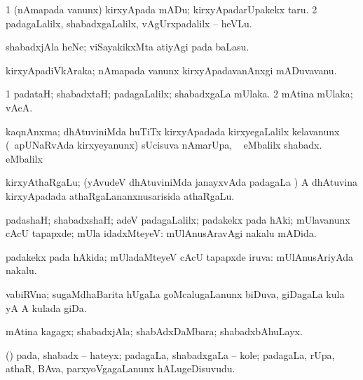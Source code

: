 \bentry
{} 
\gl{\sakirx}
\expl{}
\bmng
\bnum
\num{1} (nAmapada \mo vanunx) kirxyApada mADu; kirxyApadarUpakekx taru. 
\num{2} padagaLalilx, shabadxgaLalilx, vAgUrxpadalilx -- heVLu. 
\enum
\emng

\noindent 
\gl{\akirx}
\expl{}
\bmng
 shabadxjAla heNe; viSayakikxMta atiyAgi pada baLasu. 
\emng
\eentry

\bentry 
{} 
\gl{\nA}
\expl{}
\bmng
 kirxyApadiVkAraka; nAmapada \mo vanunx kirxyApadavanAnxgi mADuvavanu. 
\emng
\eentry

\bentry
{} 
\gl{\kirxvi}
\expl{}
\bmng
\bnum
\num{1} padataH; shabadxtaH; padagaLalilx; shabadxgaLa mUlaka. 
\num{2} mAtina mUlaka; vAcA. 
\enum
\emng
\eentry

\bentry
{} 
\gl{\nA}
\expl{}
\bmng
 kaqnAnxma; dhAtuviniMda huTiTx kirxyApadada kirxyegaLalilx kelavanunx (\kanmu\ apUNaRvAda kirxyeyanunx) sUcisuva nAmarUpa, \udA\  eMbalilx  shabadx.  eMbalilx  
\emng
\eentry

\bentry
{}
\gl{\nA}
\expl{}
\bmng
 kirxyAthaRgaLu; (yAvudeV dhAtuviniMda janayxvAda padagaLa \vi) A dhAtuvina kirxyApadada athaRgaLananxnusarisida athaRgaLu. 
\emng
\eentry

\bentry
{} 
\gl{\kirxvi}
\expl{}
\bmng
 padashaH; shabadxshaH; adeV padagaLalilx; padakekx pada hAki; mUlavanunx cAcU tapapxde; mUla idadxMteyeV:  mUlAnusAravAgi nakalu mADida. 
\emng
\eentry

\bentry
{} 
\gl{\gu}
\expl{}
\bmng
 padakekx pada hAkida; mUladaMteyeV cAcU tapapxde iruva:  mUlAnusAriyAda nakalu. 
\emng
\eentry

\bentry
{} 
\gl{\nA}
\bmng
 vabiRVna; sugaMdhaBarita hUgaLa goMcalugaLanunx biDuva, giDagaLa kula yA A kulada giDa.  
\emng
\eentry

\bentry
{} 
\gl{\nA}
\expl{}
\bmng
 mAtina kagagx; shabadxjAla; shabAdxDaMbara; shabadxbAhuLayx. 
\emng
\eentry

\bentry
{} 
\gl{\nA}
\expl{}
\bmng
 (\hA) pada, shabadx -- hateyx; padagaLa, shabadxgaLa -- kole; padagaLa, rUpa, athaR, BAva, parxyoVgagaLanunx hALugeDisuvudu. 
\emng
\eentry

